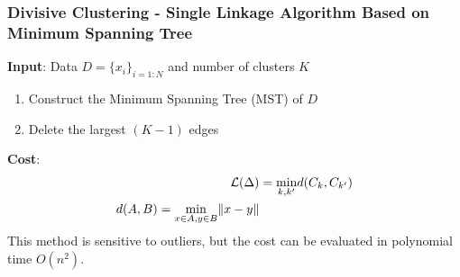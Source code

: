 \documentclass[11pt]{article}
\theoremstyle{definition}
\DeclarePairedDelimiter\norm{\lVert}{\rVert}
\begin{document}
\subsubsection{Divisive Clustering - Single Linkage Algorithm Based on Minimum Spanning Tree}
\textbf{Input}: Data $D = \{ x_i \}_{i=1:N}$ and number of clusters $K$
\begin{enumerate}
	\item Construct the Minimum Spanning Tree (MST) of $D$
	\item Delete the largest $(K-1)$ edges
\end{enumerate}
\textbf{Cost}:
\begin{align}
	\mathcal{L}(\Delta) &= \underset{k,k'}{\min}d(C_k, C_{k'})\\
	d(A,B) = \underset{x\in A, y\in B}{\min}\norm{x-y}
\end{align}
This method is sensitive to outliers, but the cost can be evaluated in polynomial time $O(n^2)$.
\end{document}
